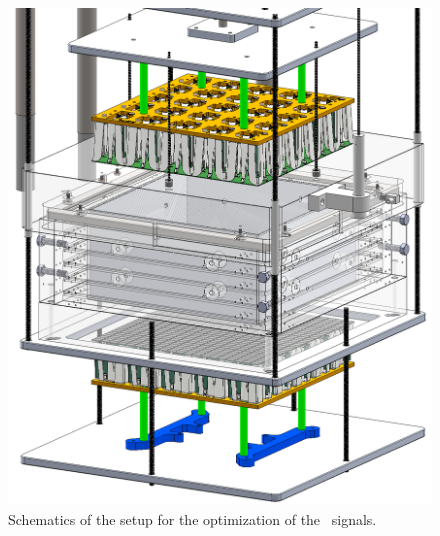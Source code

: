 \begin{figure}[!t]
\centering
\includegraphics[width=\columnwidth]{./Figures/mini-proto.png}
\caption[Schematics of the setup for the optimization of the \STwo\ signals]{Schematics of the setup for the optimization of the \STwo\ signals.}
\label{fig:mini-proto}
\end{figure}